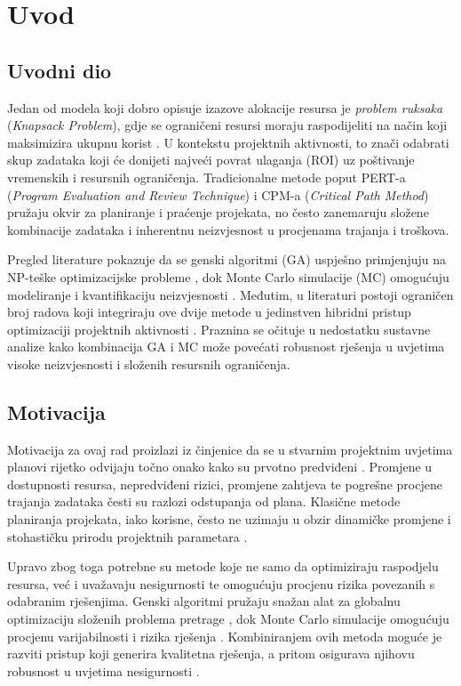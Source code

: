 \section{Uvod}

\subsection{Uvodni dio}
Jedan od modela koji dobro opisuje izazove alokacije resursa je \textit{problem ruksaka} (\textit{Knapsack Problem}), gdje se ograničeni resursi moraju raspodijeliti na način koji maksimizira ukupnu korist \cite{Kellerer2004}. U kontekstu projektnih aktivnosti, to znači odabrati skup zadataka koji će donijeti najveći povrat ulaganja (ROI) uz poštivanje vremenskih i resursnih ograničenja. Tradicionalne metode poput PERT-a (\textit{Program Evaluation and Review Technique}) i CPM-a (\textit{Critical Path Method}) \cite{Malcolm1959,Kerzner2017} pružaju okvir za planiranje i praćenje projekata, no često zanemaruju složene kombinacije zadataka i inherentnu neizvjesnost u procjenama trajanja i troškova.

Pregled literature pokazuje da se genski algoritmi (GA) uspješno primjenjuju na NP-teške optimizacijske probleme \cite{Holland1975,Goldberg1989}, dok Monte Carlo simulacije (MC) omogućuju modeliranje i kvantifikaciju neizvjesnosti \cite{Metropolis1949,Rubinstein2016}. Međutim, u literaturi postoji ograničen broj radova koji integriraju ove dvije metode u jedinstven hibridni pristup optimizaciji projektnih aktivnosti \cite{Deb2002,Zhang2011}. Praznina se očituje u nedostatku sustavne analize kako kombinacija GA i MC može povećati robusnost rješenja u uvjetima visoke neizvjesnosti i složenih resursnih ograničenja.

\subsection{Motivacija}
Motivacija za ovaj rad proizlazi iz činjenice da se u stvarnim projektnim uvjetima planovi rijetko odvijaju točno onako kako su prvotno predviđeni \cite{Kerzner2017}. Promjene u dostupnosti resursa, nepredviđeni rizici, promjene zahtjeva te pogrešne procjene trajanja zadataka česti su razlozi odstupanja od plana. Klasične metode planiranja projekata, iako korisne, često ne uzimaju u obzir dinamičke promjene i stohastičku prirodu projektnih parametara \cite{PMI2021}.

Upravo zbog toga potrebne su metode koje ne samo da optimiziraju raspodjelu resursa, već i uvažavaju nesigurnosti te omogućuju procjenu rizika povezanih s odabranim rješenjima. Genski algoritmi pružaju snažan alat za globalnu optimizaciju složenih problema pretrage \cite{Goldberg1989}, dok Monte Carlo simulacije omogućuju procjenu varijabilnosti i rizika rješenja \cite{Rubinstein2016}. Kombiniranjem ovih metoda moguće je razviti pristup koji generira kvalitetna rješenja, a pritom osigurava njihovu robusnost u uvjetima nesigurnosti \cite{Zhang2011}.


